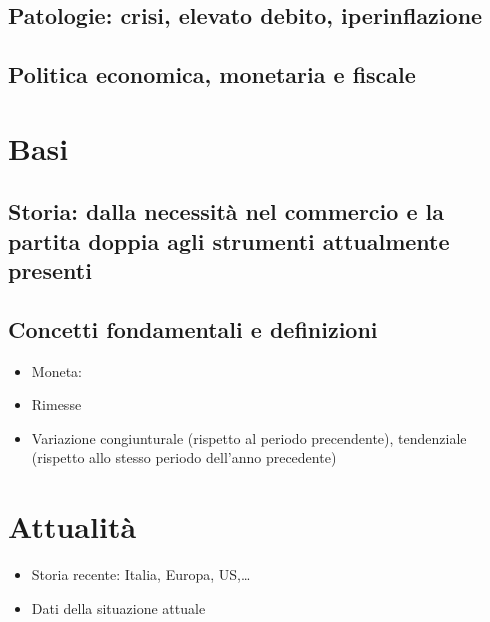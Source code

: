 \documentclass[letterpaper,10pt,italian]{jupyterBook}
\begin{document}
\subsection{Patologie: crisi, elevato debito, iperinflazione}
\label{\detokenize{ch/macro:patologie-crisi-elevato-debito-iperinflazione}}\label{\detokenize{ch/macro:economics-hs-macro-extra-issues}}

\subsection{Politica economica, monetaria e fiscale}
\label{\detokenize{ch/macro:politica-economica-monetaria-e-fiscale}}\label{\detokenize{ch/macro:economics-hs-macro-extra-policy}}

\section{Basi}
\label{\detokenize{ch/macro:basi}}

\subsection{Storia: dalla necessità nel commercio e la partita doppia agli strumenti attualmente presenti}
\label{\detokenize{ch/macro:storia-dalla-necessita-nel-commercio-e-la-partita-doppia-agli-strumenti-attualmente-presenti}}

\subsection{Concetti fondamentali e definizioni}
\label{\detokenize{ch/macro:concetti-fondamentali-e-definizioni}}\begin{itemize}
\item {} 
\sphinxAtStartPar
Moneta:

\item {} 
\sphinxAtStartPar
Rimesse

\item {} 
\sphinxAtStartPar
Variazione congiunturale (rispetto al periodo precendente), tendenziale (rispetto allo stesso periodo dell’anno precedente)

\end{itemize}


\section{Attualità}
\label{\detokenize{ch/macro:attualita}}\begin{itemize}
\item {} 
\sphinxAtStartPar
Storia recente: Italia, Europa, US,…

\item {} 
\sphinxAtStartPar
Dati della situazione attuale

\end{itemize}
\end{document}
